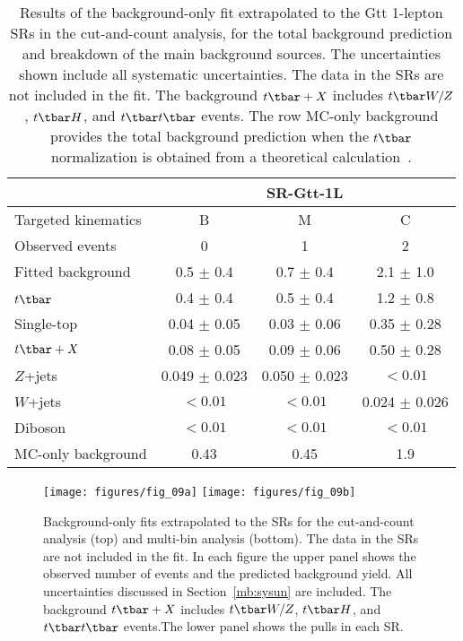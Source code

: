 \begin{table*}[htbp]
	\centering
	\begin{tabular}{lccc}
		\toprule
		& \multicolumn{3}{c}{SR-Gtt-1L} \\
		\midrule
		Targeted kinematics & B                 & M                 & C                 \\[-0.05cm]
		\midrule
		Observed events     & 0                 & 1                 & 2                 \\
		\midrule
		Fitted background   & 0.5 $\pm$ 0.4     & 0.7 $\pm$ 0.4     & 2.1 $\pm$ 1.0     \\
		\midrule
		$t\tbar$\           & 0.4 $\pm$ 0.4     & 0.5 $\pm$ 0.4     & 1.2 $\pm$ 0.8     \\
		Single-top          & 0.04 $\pm$ 0.05   & 0.03 $\pm$ 0.06   & 0.35 $\pm$ 0.28   \\
		$t\tbar+X$          & 0.08 $\pm$ 0.05   & 0.09 $\pm$ 0.06   & 0.50 $\pm$ 0.28   \\
		$Z$+jets            & 0.049 $\pm$ 0.023 & 0.050 $\pm$ 0.023 & $<0.01$           \\
		$W$+jets            & $<0.01$           & $<0.01$           & 0.024 $\pm$ 0.026 \\
		Diboson             & $<0.01$           & $<0.01$           & $<0.01$           \\
		\midrule
		MC-only background  & 0.43              & 0.45              & 1.9               \\
		\bottomrule
	\end{tabular}

	\caption{Results of the background-only fit extrapolated to the Gtt
		1-lepton SRs in the cut-and-count analysis, for the total background
		prediction and breakdown of the main background sources. The uncertainties
		shown include all systematic uncertainties. The data in the SRs are not
		included in the fit. The background $t\tbar+X$ includes $t\tbar W/Z$,
		$t\tbar H$, and $t\tbar t\tbar$ events. The row MC-only background provides
		the total background prediction when the $t\tbar$ normalization is obtained
		from a theoretical calculation~\cite{Czakon:2011xx}. }

	\label{tab:yield_discovery}

\end{table*}

\begin{figure}[H]
	\texttt{[image: figures/fig\_09a]}
	\texttt{[image: figures/fig\_09b]}
	\centering

	\caption{Background-only fits extrapolated to the SRs for the cut-and-count
		analysis (top) and multi-bin analysis (bottom). The data in the SRs are not
		included in the fit. In each figure the upper panel shows the observed number
		of events and the predicted background yield. All uncertainties discussed in
		Section~\ref{mb:sysun} are included. The background $t\tbar+X$ includes $t\tbar
			W/Z$, $t\tbar H$, and $t\tbar t\tbar$ events.The lower panel shows the pulls in
		each SR.} 
	
	\label{f:fig_09ab} 
	
  \end{figure}

